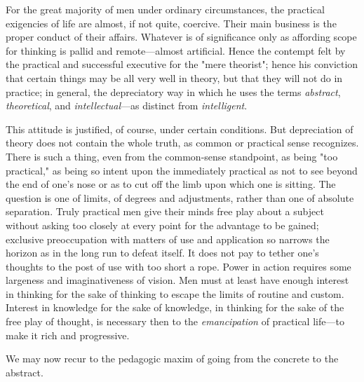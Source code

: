 \documentclass[letterpaper]{book}
\begin{document}

For the great majority of men under ordinary circumstances, the
practical exigencies of life are almost, if not quite, coercive. Their
main business is the proper conduct of their affairs. Whatever is of
significance only as affording scope for thinking is pallid and
remote---almost artificial. Hence the contempt felt by the practical and
successful executive for the "mere theorist"; hence his conviction that
certain things may be all very well in theory, but that they will not do
in practice; in general, the depreciatory way in which he uses the terms
\emph{abstract}, \emph{theoretical}, and \emph{intellectual}---as
distinct from \emph{intelligent}.


This attitude is justified, of course, under certain conditions. But
depreciation of theory does not contain the whole truth, as common or
practical sense recognizes. There is such a thing, even from the
common-sense standpoint, as being "too practical," as being so intent
upon the immediately practical as not to
see
beyond the end of one's nose or as to cut off the limb upon which one is
sitting. The question is one of limits, of degrees and adjustments,
rather than one of absolute separation. Truly practical men give their
minds free play about a subject without asking too closely at every
point for the advantage to be gained; exclusive preoccupation with
matters of use and application so narrows the horizon as in the long run
to defeat itself. It does not pay to tether one's thoughts to the post
of use with too short a rope. Power in action requires some largeness
and imaginativeness of vision. Men must at least have enough interest in
thinking for the sake of thinking to escape the limits of routine and
custom. Interest in knowledge for the sake of knowledge, in thinking for
the sake of the free play of thought, is necessary then to the
\emph{emancipation} of practical life---to make it rich and progressive.

We may now recur to the pedagogic maxim of going from the concrete to
the abstract.

\end{document}
